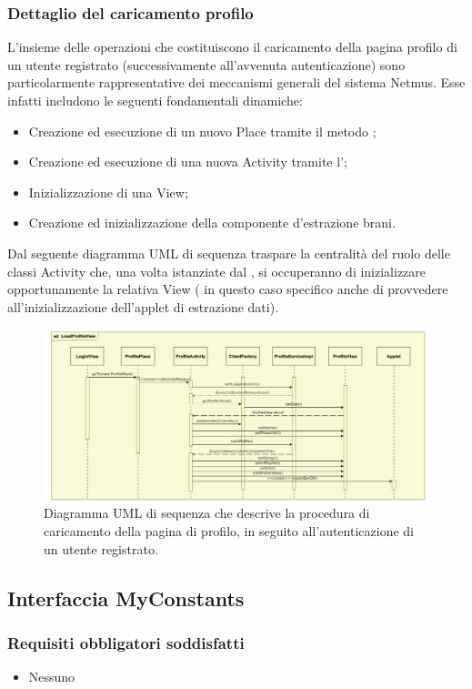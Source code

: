 \subsubsection*{Dettaglio del caricamento profilo}
L'insieme delle operazioni che costituiscono il caricamento della pagina profilo
di un utente registrato (successivamente all'avvenuta autenticazione) sono
particolarmente rappresentative dei meccanismi generali del sistema Netmus. Esse
infatti includono le seguenti fondamentali dinamiche:
\begin{itemize}
  \item Creazione ed esecuzione di un nuovo Place tramite il metodo ;
  \item Creazione ed esecuzione di una nuova Activity tramite
  l';
  \item Inizializzazione di una View;
  \item Creazione ed inizializzazione della componente d'estrazione brani.
\end{itemize}
Dal seguente diagramma UML di sequenza traspare la centralit\`a del
ruolo delle classi Activity che, una volta istanziate dal
, si occuperanno di inizializzare opportunamente la
relativa View ( in questo caso specifico anche di provvedere
all'inizializzazione dell'applet di estrazione dati).

\begin{figure}[!h]
  \centering
  \includegraphics[width=17cm]{img/DP/loadProfileView.png}
\caption{Diagramma UML di sequenza che descrive la procedura di caricamento
della pagina di profilo, in seguito all'autenticazione di un utente registrato.}
\end{figure}

\subsection{Interfaccia MyConstants}
\subsubsection*{Requisiti obbligatori soddisfatti}
\begin{itemize}
    \item Nessuno
\end{itemize}
